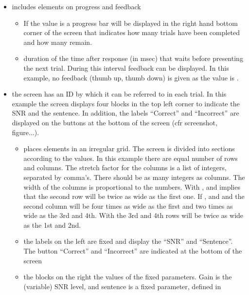 \begin{itemize}
\item {} includes elements on progress and
feedback
\begin{itemize}

\item {} If the value is  a progress
bar will be displayed in the right hand bottom corner of the
screen that indicates how many trials have been completed and how
many remain.

\item {} duration of the time after
response (in msec) that \apex waits before presenting the next
trial. During this interval feedback can be displayed. In this
example, no feedback (thumb up, thumb down) is given as the value
is .
\end{itemize}

\item {} the screen has an ID by which it can be
referred to in each trial. In this example the screen displays
four blocks in the top left corner to indicate the SNR and the
sentence. In addition, the labels ``Correct'' and ``Incorrect''
are displayed on the buttons at the bottom of the screen (cfr
screenshot, figure...).
\begin{itemize}

\item {} places elements in an irregular grid.
The screen is divided into sections according to the values. In
this example there are equal number of rows and columns. The
stretch factor for the columns is a list of integers, separated by
comma's. There should be as many integers as columns. The width of
the columns is proportional to the numbers. With ,
and   implies that the
second row will be twice as wide as the first one. If
, and  and
 the second column will be four times
as wide as the first and two times as wide as the 3rd and 4th.
With  the 3rd and 4th rows will be
twice as wide as the 1st and 2nd.

\item {} the labels on the left are fixed and display
the  ``SNR'' and ``Sentence''. The button
``Correct'' and ``Incorrect'' are indicated at the bottom of the
screen

\item {} the blocks on the right the values
of the fixed parameters. Gain is the (variable) SNR level, and
sentence is a fixed parameter, defined in 


\end{itemize}
\end{itemize}
